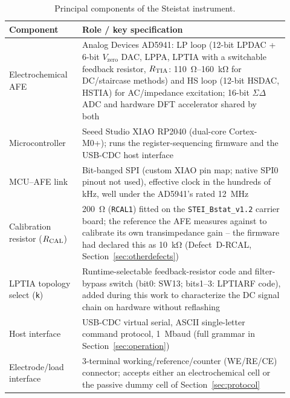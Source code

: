 \begin{table}[H]
\centering
\footnotesize
\setlength{\tabcolsep}{4pt}
\caption{Principal components of the Steistat instrument.}
\label{tab:components}
\begin{threeparttable}
\begin{tabular}{@{}p{0.24\linewidth}p{0.68\linewidth}@{}}
\toprule
Component & Role / key specification \\
\midrule
Electrochemical AFE & Analog Devices AD5941: LP loop (12-bit LPDAC + 6-bit
  $V_{\mathrm{zero}}$ DAC, LPPA, LPTIA with a switchable feedback resistor,
  $R_{\mathrm{TIA}}$: \SI{110}{\ohm}--\SI{160}{\kilo\ohm} for DC/staircase methods) and
  HS loop (12-bit HSDAC, HSTIA) for AC/impedance excitation; 16-bit
  $\Sigma\Delta$ ADC and hardware DFT accelerator shared by
  both~\cite{devices2024ad5940} \\
Microcontroller & Seeed Studio XIAO RP2040 (dual-core Cortex-M0+); runs
  the register-sequencing firmware and the USB-CDC host interface \\
MCU--AFE link & Bit-banged SPI (custom XIAO pin map; native SPI0 pinout
  not used), effective clock in the hundreds of kHz, well under the
  AD5941's rated \SI{12}{\mega\hertz}~\cite{devices2024ad5940} \\
Calibration resistor ($R_{\mathrm{CAL}}$) & \SI{200}{\ohm} (\texttt{RCAL1}) fitted on
  the \texttt{STEI\_Bstat\_v1.2} carrier board; the reference the AFE
  measures against to calibrate its own transimpedance gain -- the firmware
  had declared this as \SI{10}{\kilo\ohm} (Defect~D-RCAL, Section~\ref{sec:otherdefects}) \\
LPTIA topology select (\texttt{k}) & Runtime-selectable feedback-resistor
  code and filter-bypass switch (bit0: SW13; bits1--3: LPTIARF code),
  added during this work to characterize the DC signal chain on hardware
  without reflashing \\
Host interface & USB-CDC virtual serial, ASCII single-letter command
  protocol, \SI{1}{\mega baud} (full grammar in Section~\ref{sec:operation}) \\
Electrode/load interface & 3-terminal working/reference/counter (WE/RE/CE)
  connector; accepts either an electrochemical cell or the passive dummy
  cell of Section~\ref{sec:protocol} \\
\bottomrule
\end{tabular}
\end{threeparttable}
\end{table}

